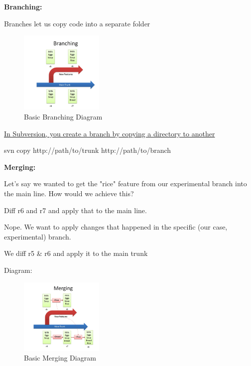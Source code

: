 \documentclass{article}
\begin{document}
\begin{flushedleft}
\textbf{Branching:} \\
\par

Branches let us copy code into a separate folder \\
\par

\begin{figure}[htp]
\centering
\includegraphics[width=4cm]{Branching.png}
\caption{Basic Branching Diagram}
\label{fig:BBDiagram}
\end{figure} 

\underline{In Subversion, you create a branch by copying a directory to another} \\
\par

svn copy http://path/to/trunk http://path/to/branch \\
\par

\textbf{Merging:} \\
\par

Let's say we wanted to get the "rice" feature from our experimental branch into the main line. How would we achieve this? \par
Diff r6 and r7 and apply that to the main line. \\
\par

Nope. We want to apply changes that happened in the specific (our case, experimental) branch. \par
We diff r5 \& r6 and apply it to the main trunk \\
\par

Diagram:


\begin{figure}[htp]
\centering
\includegraphics[width=4cm]{Merging.png}
\caption{Basic Merging Diagram}
\label{fig:BMDiagram}
\end{figure} 


\end{flushedleft}
\end{document}
